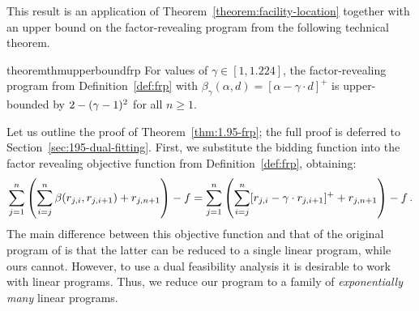 This result is an application of Theorem~\ref{theorem:facility-location} together with an upper bound on the factor-revealing program from the following technical theorem.
\begin{restatable}{theorem}{thmupperboundfrp}\label{thm:1.95-frp}
    For values of $\gamma\in [1,1.224]$, the factor-revealing program from Definition~\ref{def:frp} with $\beta_\gamma(\alpha,d)=[\alpha-\gamma\cdot d]^+$ is upper-bounded by $2-(\gamma-1)^2$ for all $n \geq 1$.
\end{restatable}

Let us outline the proof of Theorem~\ref{thm:1.95-frp}; the full proof is deferred to Section~\ref{sec:195-dual-fitting}.
First, we substitute the bidding function into the factor revealing objective function from Definition~\ref{def:frp}, obtaining:
\begin{equation*}
    \sum_{j=1}^{n} \left(\sum_{i=j}^{n} \beta(r_{j,i}, r_{j,i+1})  + r_{j,n+1} \right) - f
    = \sum_{j=1}^{n} \left(\sum_{i=j}^{n} [r_{j,i} - \gamma \cdot r_{j,i+1}]^+  + r_{j,n+1} \right) - f\,.
\end{equation*}
The main difference between this objective function and that of the original program of \cite{JMS02,JainMMSV03} is that the latter can be reduced to a single linear program, while ours cannot. 
However, to use a dual feasibility analysis it is desirable to work with linear programs.
Thus, we reduce our program to a family of \emph{exponentially many} linear programs.

